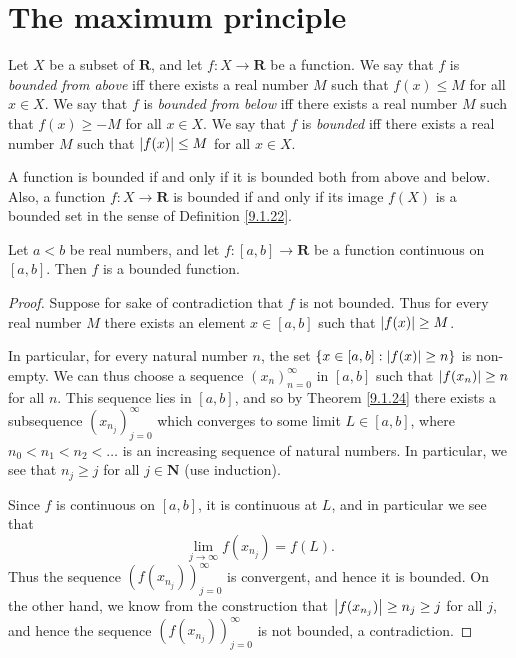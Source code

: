 \section{The maximum principle}\label{sec 9.6}

\begin{definition}\label{9.6.1}
    Let \(X\) be a subset of \(\mathbf{R}\), and let \(f : X \to \mathbf{R}\) be a function.
    We say that \(f\) is \emph{bounded from above} iff there exists a real number \(M\) such that \(f(x) \leq M\) for all \(x \in X\).
    We say that \(f\) is \emph{bounded from below} iff there exists a real number \(M\) such that \(f(x) \geq -M\) for all \(x \in X\).
    We say that \(f\) is \emph{bounded} iff there exists a real number \(M\) such that \(\abs*{f(x)} \leq M\) for all \(x \in X\).
\end{definition}

\begin{remark}\label{9.6.2}
    A function is bounded if and only if it is bounded both from above and below.
    Also, a function \(f : X \to \mathbf{R}\) is bounded if and only if its image \(f(X)\) is a bounded set in the sense of Definition \ref{9.1.22}.
\end{remark}

\begin{lemma}\label{9.6.3}
    Let \(a < b\) be real numbers, and let \(f : [a, b] \to \mathbf{R}\) be a function continuous on \([a, b]\).
    Then \(f\) is a bounded function.
\end{lemma}

\begin{proof}
    Suppose for sake of contradiction that \(f\) is not bounded.
    Thus for every real number \(M\) there exists an element \(x \in [a, b]\) such that \(\abs*{f(x)} \geq M\).

    In particular, for every natural number \(n\), the set \(\{x \in [a, b] : \abs*{f(x)} \geq n\}\) is non-empty.
    We can thus choose a sequence \((x_n)_{n = 0}^\infty\) in \([a, b]\) such that \(\abs*{f(x_n)} \geq n\) for all \(n\).
    This sequence lies in \([a, b]\), and so by Theorem \ref{9.1.24} there exists a subsequence \((x_{n_j})_{j = 0}^\infty\) which converges to some limit \(L \in [a, b]\), where \(n_0 < n_1 < n_2 < \dots\) is an increasing sequence of natural numbers.
    In particular, we see that \(n_j \geq j\) for all \(j \in \mathbf{N}\) (use induction).

    Since \(f\) is continuous on \([a, b]\), it is continuous at \(L\), and in particular we see that
    \[
        \lim_{j \to \infty} f(x_{n_j}) = f(L).
    \]
    Thus the sequence \((f(x_{n_j}))_{j = 0}^\infty\) is convergent, and hence it is bounded.
    On the other hand, we know from the construction that \(\abs*{f(x_{n_j})} \geq n_j \geq j\) for all \(j\), and hence the sequence \((f(x_{n_j}))_{j = 0}^\infty\) is not bounded, a contradiction.
\end{proof}

